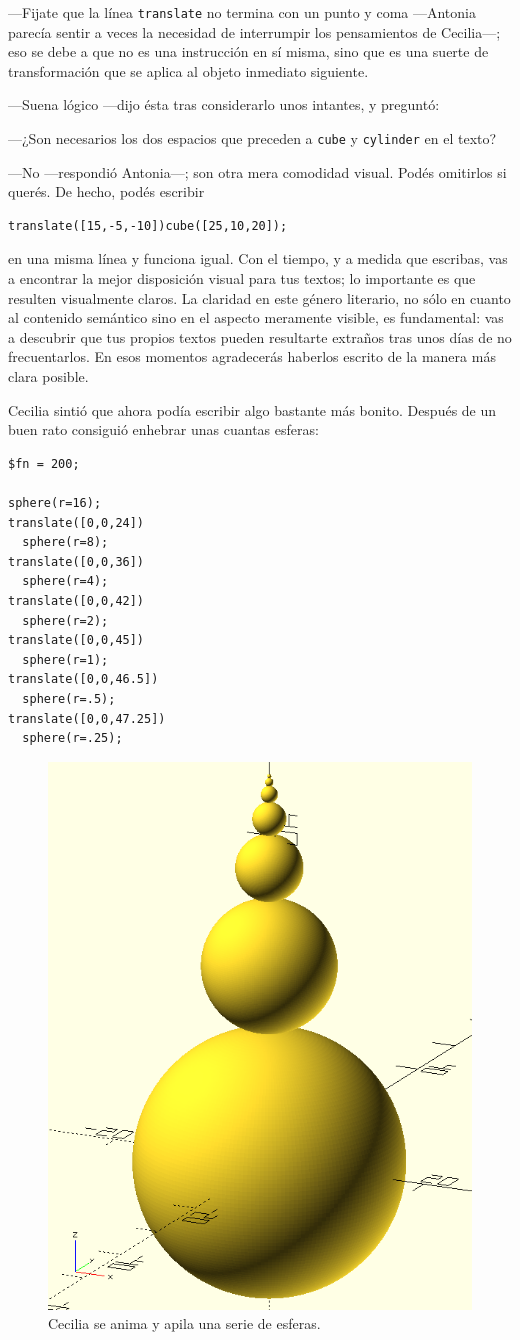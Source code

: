 ---Fijate que la línea \lstinline!translate! no termina con un punto y
coma ---Antonia parecía sentir a veces la necesidad de interrumpir los
pensamientos de Cecilia---; eso se debe a que no es una instrucción en
sí misma, sino que es una suerte de transformación que se aplica al
objeto inmediato siguiente.

---Suena lógico ---dijo ésta tras considerarlo unos intantes, y
preguntó:

---¿Son necesarios los dos espacios que preceden a \lstinline!cube!  y
\lstinline!cylinder!  en el texto?

---No ---respondió Antonia---; son otra mera comodidad visual. Podés
omitirlos si querés. De hecho, podés escribir
\begin{lstlisting}[numbers=none]
translate([15,-5,-10])cube([25,10,20]);
\end{lstlisting}
\noindent en una misma línea y funciona igual. Con el tiempo, y a
medida que escribas, vas a encontrar la mejor disposición visual para
tus textos; lo importante es que resulten visualmente claros. La
claridad en este género literario, no sólo en cuanto al contenido
semántico sino en el aspecto meramente visible, es fundamental: vas a
descubrir que tus propios textos pueden resultarte extraños tras unos
días de no frecuentarlos. En esos momentos agradecerás haberlos
escrito de la manera más clara posible.

Cecilia sintió que ahora podía escribir algo bastante más
bonito. Después de un buen rato consiguió enhebrar unas cuantas
esferas:

    \begin{lstlisting}
$fn = 200;
      
sphere(r=16);
translate([0,0,24])
  sphere(r=8);
translate([0,0,36])
  sphere(r=4);
translate([0,0,42])
  sphere(r=2);
translate([0,0,45])
  sphere(r=1);
translate([0,0,46.5])
  sphere(r=.5);
translate([0,0,47.25])
  sphere(r=.25);    
    \end{lstlisting}%


\begin{figure}[ht]
     \centering
     \includegraphics[width=.6\textwidth]{imagenes/esferas}
   \caption{Cecilia se anima y apila una serie de esferas.}
   \label{fig:esferas}
\end{figure}

